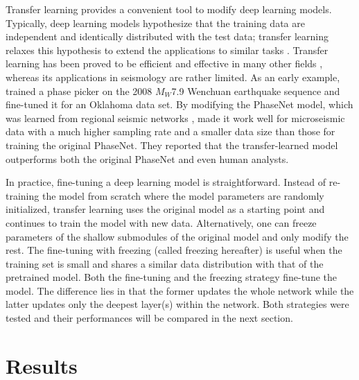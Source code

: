 \documentclass{gji}
\begin{document}
Transfer learning provides a convenient tool to modify deep learning models. Typically, deep learning models hypothesize that the training data are independent and identically distributed with the test data; transfer learning relaxes this hypothesis to extend the applications to similar tasks \citep{tan}. Transfer learning has been proved to be efficient and effective in many other fields \citep{long,long_15,pan_domain}, whereas its applications in seismology are rather limited. As an early example, \cite{zhulijun} trained a phase picker on the 2008 $M_W$7.9 Wenchuan earthquake sequence and fine-tuned it for an Oklahoma data set. By modifying the PhaseNet model, which was learned from regional seismic networks \citep{phasenet}, \cite{chai} made it work well for microseismic data with a much higher sampling rate and a smaller data size than those for training the original PhaseNet. They reported that the transfer-learned model outperforms both the original PhaseNet and even human analysts.

In practice, fine-tuning a deep learning model is straightforward. Instead of re-training the model from scratch where the model parameters are randomly initialized, transfer learning uses the original model as a starting point and continues to train the model with new data. Alternatively, one can freeze parameters of the shallow submodules of the original model and only modify the rest. The fine-tuning with freezing (called freezing hereafter) is useful when the training set is small and shares a similar data distribution with that of the pretrained model. Both the fine-tuning and the freezing strategy fine-tune the model. The difference lies in that the former updates the whole network while the latter updates only the deepest layer(s) within the network. Both strategies were tested and their performances will be compared in the next section.

\section{Results}
\end{document}
